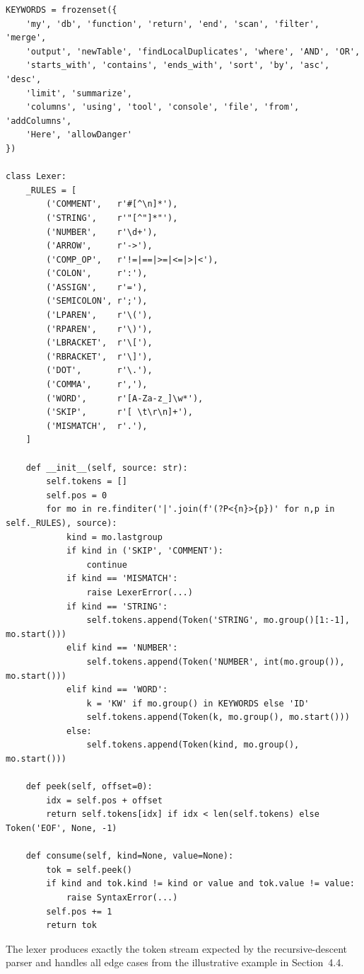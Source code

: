 \begin{lstlisting}[style=dsl, caption={Core lexer implementation (excerpt)}, label={lst:lexer}]
KEYWORDS = frozenset({
    'my', 'db', 'function', 'return', 'end', 'scan', 'filter', 'merge',
    'output', 'newTable', 'findLocalDuplicates', 'where', 'AND', 'OR',
    'starts_with', 'contains', 'ends_with', 'sort', 'by', 'asc', 'desc',
    'limit', 'summarize',
    'columns', 'using', 'tool', 'console', 'file', 'from', 'addColumns',
    'Here', 'allowDanger'
})

class Lexer:
    _RULES = [
        ('COMMENT',   r'#[^\n]*'),
        ('STRING',    r'"[^"]*"'),
        ('NUMBER',    r'\d+'),
        ('ARROW',     r'->'),
        ('COMP_OP',   r'!=|==|>=|<=|>|<'),
        ('COLON',     r':'),
        ('ASSIGN',    r'='),
        ('SEMICOLON', r';'),
        ('LPAREN',    r'\('),
        ('RPAREN',    r'\)'),
        ('LBRACKET',  r'\['),
        ('RBRACKET',  r'\]'),
        ('DOT',       r'\.'),
        ('COMMA',     r','),
        ('WORD',      r'[A-Za-z_]\w*'),
        ('SKIP',      r'[ \t\r\n]+'),
        ('MISMATCH',  r'.'),
    ]

    def __init__(self, source: str):
        self.tokens = []
        self.pos = 0
        for mo in re.finditer('|'.join(f'(?P<{n}>{p})' for n,p in self._RULES), source):
            kind = mo.lastgroup
            if kind in ('SKIP', 'COMMENT'):
                continue
            if kind == 'MISMATCH':
                raise LexerError(...)
            if kind == 'STRING':
                self.tokens.append(Token('STRING', mo.group()[1:-1], mo.start()))
            elif kind == 'NUMBER':
                self.tokens.append(Token('NUMBER', int(mo.group()), mo.start()))
            elif kind == 'WORD':
                k = 'KW' if mo.group() in KEYWORDS else 'ID'
                self.tokens.append(Token(k, mo.group(), mo.start()))
            else:
                self.tokens.append(Token(kind, mo.group(), mo.start()))

    def peek(self, offset=0):
        idx = self.pos + offset
        return self.tokens[idx] if idx < len(self.tokens) else Token('EOF', None, -1)

    def consume(self, kind=None, value=None):
        tok = self.peek()
        if kind and tok.kind != kind or value and tok.value != value:
            raise SyntaxError(...)
        self.pos += 1
        return tok
\end{lstlisting}

The lexer produces exactly the token stream expected by the recursive-descent parser and handles all edge cases from the illustrative example in Section~4.4.

